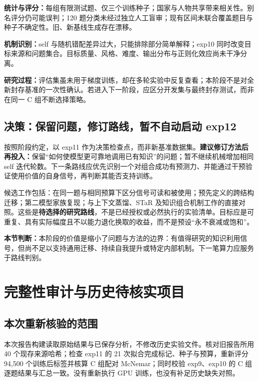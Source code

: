 \documentclass[11pt,a4paper]{article}
\newcommand{\takeaway}[1]{\par\noindent\colorbox{light}{\parbox{\dimexpr\linewidth-2\fboxsep\relax}{\small\textbf{本节判断：}#1}}\par}
\begin{document}
\textbf{统计与评分：}每组有限测试题、仅三个训练种子；国家与人物共享带来相关性。别名评分仍可能误判；120 题分类未经过独立人工盲审；现有区间未联合覆盖题目与种子不确定性。旧、新基线生成存在漂移。

\textbf{机制识别：}self 与随机错配差异过大，只能排除部分简单解释；exp10 同时改变目标来源和问题集合。目标质量、风格、难度、输出分布与正则化效应尚未干净分离。

\textbf{研究过程：}评估集虽未用于梯度训练，却在多轮实验中反复查看；本阶段不是对全新封存基准的一次性确认。若进入下一阶段，应区分开发集与最终封存测试，而非在同一 C 组不断选择策略。
\subsection{决策：保留问题，修订路线，暂不自动启动 exp12}
按照阶段约定，以 exp11 作为决策检查点，而非新基准数据集。\textbf{建议修订方法后再投入：}保留“如何使模型更可靠地调用已有知识”的问题；暂不继续机械增加相同 self 迭代轮数。下一条路线应优先识别一个对组合成功有预测力、并能通过干预验证使用价值的自身信号，再判断其能否支持训练。

候选工作包括：在同一题与相同预算下区分信号可读和被使用；预先定义的跨结构迁移；第二模型家族复现；与上下文蒸馏、STaR 及知识组合机制工作的直接对照。这些是\textbf{待选择的研究路线}，不是已经授权或必然执行的实验清单。目标应是可重复、具有实际幅度且不以能力退化换取的收益，而不是预设“永不衰减或饱和”。
\takeaway{本阶段的价值是缩小了问题与方法的边界：有值得研究的知识利用信号，但尚不足以支持通用迁移、持续自我提升或特定内部机制。下一笔算力应服务于路线判别。}
\clearpage
\appendix
\section{完整性审计与历史待核实项目}
\subsection{本次重新核验的范围}
本次报告构建读取原始结果与已保存分析，不修改历史实验文件。核对旧报告所用 40 个现存来源哈希；检查 exp11 的 21 次拟合完成标记、种子与预算，重新评分 94,500 个训练后标签并核算 C 组配对 McNemar；同时校验 exp9、exp10 的 C 组逐题结果与汇总一致。没有重新执行 GPU 训练，也没有补足历史缺失对照。
\end{document}
